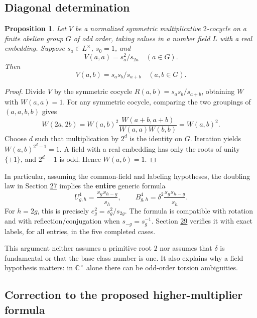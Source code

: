 \documentclass[11pt,reqno]{amsart}
\theoremstyle{plain}
\newtheorem{proposition}[theorem]{Proposition}
\begin{document}
\subsection{Diagonal determination}\label{sec:28.2}

\begin{proposition}
Let \(V\) be a normalized symmetric multiplicative
\(2\)-cocycle on a finite abelian group \(G\) of odd order, taking values
in a number field \(L\) with a real embedding. Suppose \(s_a\in L^\times\),
\(s_0=1\), and
\[
 V(a,a)=s_a^2/s_{2a}\quad(a\in G).
\]
Then
\[
 \boxed{V(a,b)=s_as_b/s_{a+b}\quad(a,b\in G).}
\]
\end{proposition}

\begin{proof}
Divide \(V\) by the symmetric cocycle
\(R(a,b)=s_as_b/s_{a+b}\), obtaining \(W\) with \(W(a,a)=1\).
For any symmetric cocycle, comparing the two groupings of
\((a,a,b,b)\) gives
\[
 W(2a,2b)=W(a,b)^2
 \frac{W(a+b,a+b)}{W(a,a)W(b,b)}=W(a,b)^2.
\]
Choose \(d\) such that multiplication by \(2^d\) is the identity on
\(G\). Iteration yields \(W(a,b)^{2^d-1}=1\). A field with a real
embedding has only the roots of unity \(\{\pm1\}\), and \(2^d-1\)
is odd. Hence \(W(a,b)=1\).
\end{proof}

In particular, assuming the common-field and labeling hypotheses, the
doubling law in Section \hyperref[sec:27]{27} implies the \textbf{entire} generic formula
\begin{equation*}
 \boxed{
 U_{g,h}^4=\frac{s_gs_{h-g}}{s_h},\qquad
 B_{g,h}^4=\delta^2\frac{s_gs_{h-g}}{s_h}.
 }
 \tag{28.1}
\end{equation*}
For \(h=2g\), this is precisely \(e_g^2=s_g^2/s_{2g}\).
The formula is compatible with rotation and with reflection/conjugation
when \(s_{-g}=s_g^{-1}\). Section \hyperref[sec:29]{29} verifies it with exact labels,
for all entries, in the five completed cases.

This argument neither assumes a primitive root \(2\) nor assumes that
\(\delta\) is fundamental or that the base class number is one.
It also explains why a field hypothesis matters: in \(\mathbb C^\times\)
alone there can be odd-order torsion ambiguities.

\subsection{Correction to the proposed higher-multiplier formula}\label{sec:28.3}
\end{document}
